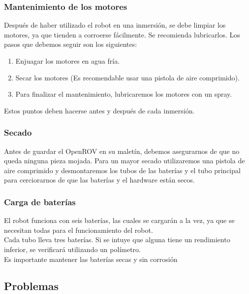 \subsubsection{Mantenimiento de los motores}
\label{subsubsec:mantenimiento}
Después de haber utilizado el robot en una inmersión, se debe limpiar los motores, ya que tienden a corroerse fácilmente. Se recomienda lubricarlos.
Los pasos que debemos seguir son los siguientes:
\begin{enumerate}
\item Enjuagar los motores en agua fría.
\item Secar los motores (Es recomendable usar una pistola de aire comprimido).
\item Para finalizar el mantenimiento, lubricaremos los motores con un spray.
\end{enumerate}
Estos puntos deben hacerse antes y después de cada inmersión.
  
\subsubsection{Secado}
\label{subsubsec:secado}
Antes de guardar el OpenROV en su maletín, debemos asegurarnos de que no queda ninguna pieza mojada.
Para un mayor secado utilizaremos una pistola de aire comprimido y desmontaremos los tubos de las baterías y el tubo principal para cerciorarnos de que las baterías y el hardware están secos.
  
\subsubsection{Carga de baterías}
\label{subsubsec:bateria}
El robot funciona con seis baterías, las cuales se cargarán a la vez, ya que se necesitan todas para el funcionamiento del robot.
\\Cada tubo lleva tres baterías. Si se intuye que alguna tiene un rendimiento inferior, se verificará utilizando un polímetro.
\\Es importante mantener las baterías secas y sin corrosión

\subsection{Problemas}
\label{subsec:problemas}

